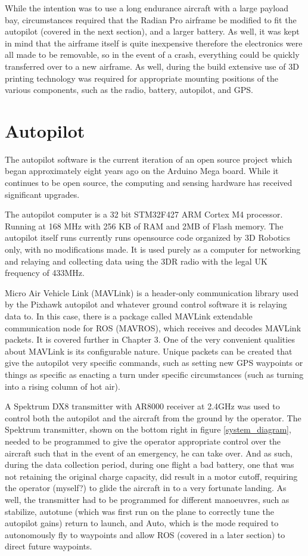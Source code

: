 \documentclass[12pt]{report}
\begin{document}
While the intention was to use a long endurance aircraft with a large payload bay, circumstances required that the Radian Pro airframe be modified to fit the autopilot (covered in the next section), and a larger battery. As well, it was kept in mind that the airframe itself is quite inexpensive therefore the electronics were all made to be removable, so in the event of a crash, everything could be quickly transferred over to a new airframe. As well, during the build extensive use of 3D printing technology was required for appropriate mounting positions of the various components, such as the radio, battery, autopilot, and GPS.

\section{Autopilot}
The autopilot software is the current iteration of an open source project which began approximately eight years ago on the Arduino Mega board. While it continues to be open source, the computing and sensing hardware has received significant upgrades.

The autopilot computer is a 32 bit STM32F427 ARM Cortex M4 processor. Running at 168 MHz with 256 KB of RAM and 2MB of Flash memory. The autopilot itself runs currently runs opensource code organized by 3D Robotics only, with no modifications made. It is used purely as a computer for networking and relaying and collecting data using the 3DR radio with the legal UK frequency of 433MHz.

Micro Air Vehicle Link (MAVLink) is a header-only communication library used by the Pixhawk autopilot and whatever ground control software it is relaying data to. In this case, there is a package called MAVLink extendable communication node for ROS (MAVROS), which receives and decodes MAVLink packets. It is covered further in Chapter 3. One of the very convenient qualities about MAVLink is its configurable nature. Unique packets can be created that give the autopilot very specific commands, such as setting new GPS waypoints or things as specific as enacting a turn under specific circumstances (such as turning into a rising column of hot air).

A Spektrum DX8 transmitter with AR8000 receiver at 2.4GHz was used to control both the autopilot and the aircraft from the ground by the operator. The Spektrum transmitter, shown on the bottom right in figure \ref{system_diagram}, needed to be programmed to give the operator appropriate control over the aircraft such that in the event of an emergency, he can take over. And as such, during the data collection period, during one flight a bad battery, one that was not retaining the original charge capacity, did result in a motor cutoff, requiring the operator (myself?) to glide the aircraft in to a very fortunate landing. As well, the transmitter had to be programmed for different manoeuvres, such as stabilize, autotune (which was first run on the plane to correctly tune the autopilot gains) return to launch, and Auto, which is the mode required to autonomously fly to waypoints and allow ROS (covered in a later section) to direct future waypoints.
\end{document}
